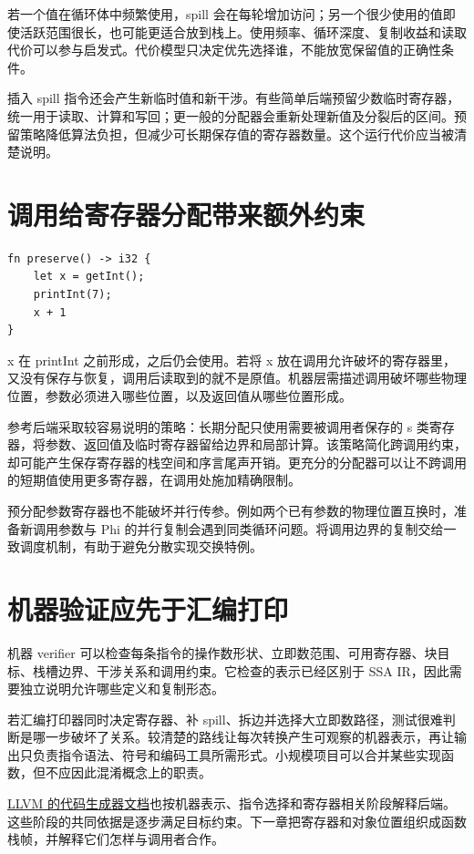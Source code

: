 若一个值在循环体中频繁使用，spill 会在每轮增加访问；另一个很少使用的值即使活跃范围很长，也可能更适合放到栈上。使用频率、循环深度、复制收益和读取代价可以参与启发式。代价模型只决定优先选择谁，不能放宽保留值的正确性条件。

插入 spill 指令还会产生新临时值和新干涉。有些简单后端预留少数临时寄存器，统一用于读取、计算和写回；更一般的分配器会重新处理新值及分裂后的区间。预留策略降低算法负担，但减少可长期保存值的寄存器数量。这个运行代价应当被清楚说明。

\section{调用给寄存器分配带来额外约束}
\begin{lstlisting}[language=Rustless,caption={局部值需要跨越输出调用继续存在}]
fn preserve() -> i32 {
    let x = getInt();
    printInt(7);
    x + 1
}
\end{lstlisting}
x 在 printInt 之前形成，之后仍会使用。若将 x 放在调用允许破坏的寄存器里，又没有保存与恢复，调用后读取到的就不是原值。机器层需描述调用破坏哪些物理位置，参数必须进入哪些位置，以及返回值从哪些位置形成。

参考后端采取较容易说明的策略：长期分配只使用需要被调用者保存的 s 类寄存器，将参数、返回值及临时寄存器留给边界和局部计算。该策略简化跨调用约束，却可能产生保存寄存器的栈空间和序言尾声开销。更充分的分配器可以让不跨调用的短期值使用更多寄存器，在调用处施加精确限制。

预分配参数寄存器也不能破坏并行传参。例如两个已有参数的物理位置互换时，准备新调用参数与 Phi 的并行复制会遇到同类循环问题。将调用边界的复制交给一致调度机制，有助于避免分散实现交换特例。

\section{机器验证应先于汇编打印}
机器 verifier 可以检查每条指令的操作数形状、立即数范围、可用寄存器、块目标、栈槽边界、干涉关系和调用约束。它检查的表示已经区别于 SSA IR，因此需要独立说明允许哪些定义和复制形态。

若汇编打印器同时决定寄存器、补 spill、拆边并选择大立即数路径，测试很难判断是哪一步破坏了关系。较清楚的路线让每次转换产生可观察的机器表示，再让输出只负责指令语法、符号和编码工具所需形式。小规模项目可以合并某些实现函数，但不应因此混淆概念上的职责。

\href{https://llvm.org/docs/CodeGenerator.html}{LLVM 的代码生成器文档}也按机器表示、指令选择和寄存器相关阶段解释后端。这些阶段的共同依据是逐步满足目标约束。下一章把寄存器和对象位置组织成函数栈帧，并解释它们怎样与调用者合作。

